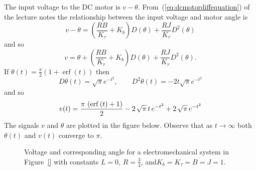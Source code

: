 \begin{excersizelist}
\begin{solution}
The input voltage to the DC motor is $v - \theta$.  From~(\ref{eq:dcmotordiffequation}) of the lecture notes the relationship between the input voltage and motor angle is
\[
v - \theta = \left(\frac{RB}{K_\tau} + K_b\right) D(\theta) + \frac{RJ}{K_\tau} D^2(\theta)
\] 
and so
\[
v = \theta + \left(\frac{RB}{K_\tau} + K_b\right) D(\theta) + \frac{RJ}{K_\tau} D^2(\theta).
\]
If $\theta(t) = \frac{\pi}{2} (1 + \operatorname{erf}(t) )$ then
\[
D\theta(t) = \sqrt{\pi} e^{-t^2}, \qquad D^2\theta(t) = -2t \sqrt{\pi} e^{-t^2}
\]
and so
\[
v(t) = {{\pi\,\left(\mathrm{erf}\left(t\right)+1\right)}\over{2}}-2\,
 \sqrt{\pi}\,t\,e^ {- t^2 }+2\,\sqrt{\pi}\,e^ {- t^2 }
\]
The signals $v$ and $\theta$ are plotted in the figure below.  Observe that as $t \to \infty$ both $\theta(t)$ and $v(t)$ converge to $\pi$.

\begin{figure}[tp]
  \centering
  \caption{Voltage and corresponding angle for a electromechanical system in Figure~\ref{} with constants $L =0$, $R = \tfrac{3}{4}$, and$K_b=K_\tau=B=J=1$.} \label{fig:dcmotoranim}
\end{figure}






\end{solution}
\end{excersizelist}
